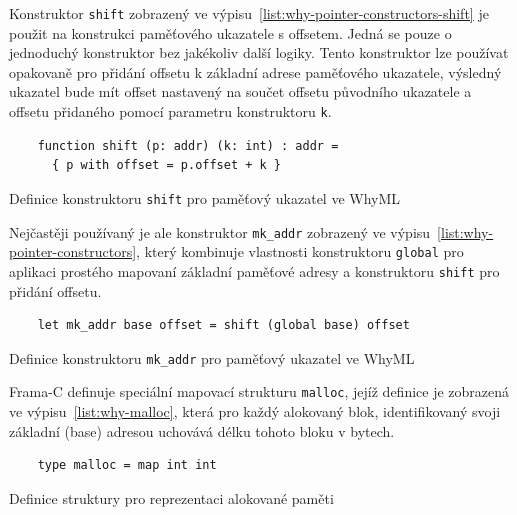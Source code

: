 Konstruktor \texttt{shift} zobrazený ve výpisu~\ref{list:why-pointer-constructors-shift}
je použit na konstrukci paměťového ukazatele s offsetem.
Jedná se pouze o jednoduchý konstruktor bez jakékoliv další logiky.
Tento konstruktor lze používat opakovaně pro přidání offsetu k základní adrese paměťového ukazatele,
výsledný ukazatel bude mít offset nastavený na součet offsetu původního ukazatele
a offsetu přidaného pomocí parametru konstruktoru \texttt{k}.

\begin{listing}[H]
    \begin{verbatim}
    function shift (p: addr) (k: int) : addr =
      { p with offset = p.offset + k }
    \end{verbatim}
    \caption{Definice konstruktoru \texttt{shift} pro paměťový ukazatel ve WhyML}
    \label{list:why-pointer-constructors-shift}
\end{listing}

Nejčastěji používaný je ale konstruktor \texttt{mk\_addr} zobrazený ve výpisu~\ref{list:why-pointer-constructors},
který kombinuje vlastnosti konstruktoru \texttt{global} pro aplikaci prostého mapovaní
základní paměťové adresy a konstruktoru \texttt{shift} pro přidání offsetu.


\begin{listing}[H]
    \begin{verbatim}
    let mk_addr base offset = shift (global base) offset
    \end{verbatim}
    \caption{Definice konstruktoru \texttt{mk\_addr} pro paměťový ukazatel ve WhyML}
    \label{list:why-pointer-constructor-mk-addr}
\end{listing}

Frama\mbox{-}C definuje speciální mapovací strukturu \texttt{malloc},
jejíž definice je zobrazená ve výpisu~\ref{list:why-malloc},
která pro každý alokovaný blok, identifikovaný svoji základní (base) adresou
uchovává délku tohoto bloku v bytech.

\begin{listing}[H]
    \begin{verbatim}
    type malloc = map int int
    \end{verbatim}
    \caption{Definice struktury pro reprezentaci alokované paměti}
    \label{list:why-malloc}
\end{listing}

